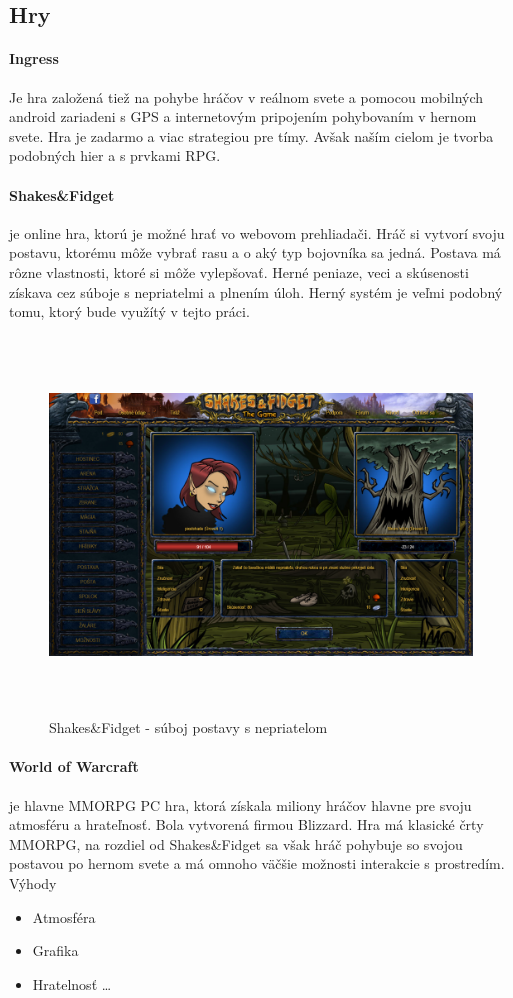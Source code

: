 \subsection{Hry}
\paragraph{Ingress} Je hra založená tiež na pohybe hráčov v reálnom svete a pomocou mobilných android zariadeni s GPS a internetovým pripojením pohybovaním v hernom svete. Hra je zadarmo a viac strategiou pre tímy. Avšak naším cielom je tvorba podobných hier a s prvkami RPG.


\paragraph{Shakes\&Fidget} je online hra, ktorú je možné hrať vo webovom prehliadači\cite{sfgame}. Hráč si vytvorí svoju postavu, ktorému môže vybrať rasu a o aký typ bojovníka sa jedná. Postava má rôzne vlastnosti, ktoré si môže vylepšovať. Herné peniaze, veci a skúsenosti získava cez súboje s nepriatelmi a plnením úloh. Herný systém je veľmi podobný tomu, ktorý bude využítý v tejto práci.

\begin{figure}
  \centering
  \includegraphics[height=10cm]{mainmatter/imgs/shakes.png}
  \caption{Shakes\&Fidget - súboj postavy s nepriatelom}
  \label{fig:comenius}
\end{figure}


\paragraph{World of Warcraft} je hlavne MMORPG PC hra, ktorá získala miliony hráčov hlavne pre svoju atmosféru a hrateľnosť. Bola vytvorená firmou Blizzard\cite{wow-blizard}. Hra má klasické črty MMORPG, na rozdiel od Shakes\&Fidget sa však hráč pohybuje so svojou postavou po hernom svete a má omnoho väčšie možnosti interakcie s prostredím\cite{wow-blizard-guide}. 
Výhody
\begin{itemize}
  \item Atmosféra
  \item Grafika 
  \item Hratelnosť \ldots
\end{itemize}


